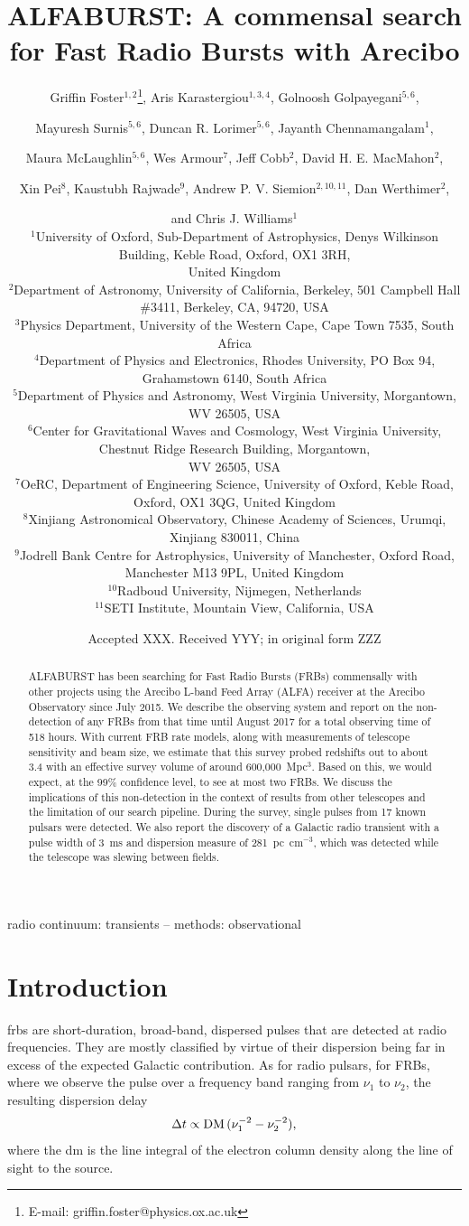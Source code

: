 \documentclass[a4paper,fleqn,usenatbib]{mnras}
\title[The ALFABURST Commensal FRB Survey]{ALFABURST: A commensal search for
Fast Radio Bursts with Arecibo}
\author[G. Foster et al.]{Griffin Foster$^{1,2}$\thanks{E-mail: griffin.foster@physics.ox.ac.uk},
Aris Karastergiou$^{1,3,4}$,
Golnoosh Golpayegani$^{5,6}$,
\and Mayuresh Surnis$^{5,6}$, 
Duncan R. Lorimer$^{5,6}$,
Jayanth Chennamangalam$^{1}$,
\and Maura McLaughlin$^{5,6}$,
Wes Armour$^{7}$,
Jeff Cobb$^{2}$,
David H. E. MacMahon$^{2}$,
\and Xin Pei$^{8}$,
Kaustubh Rajwade$^{9}$, 
Andrew P. V. Siemion$^{2,10,11}$,
Dan Werthimer$^{2}$,
\and and Chris J. Williams$^{1}$
\\
$^{1}$University of Oxford, Sub-Department of Astrophysics, Denys Wilkinson Building, Keble Road, Oxford, OX1 3RH,\\United Kingdom\\
$^{2}$Department of Astronomy, University of California, Berkeley, 501 Campbell Hall \#3411, Berkeley, CA, 94720, USA\\
$^{3}$Physics Department, University of the Western Cape, Cape Town 7535, South Africa\\
$^{4}$Department of Physics and Electronics, Rhodes University, PO Box 94, Grahamstown 6140, South Africa\\
$^{5}$Department of Physics and Astronomy, West Virginia University, Morgantown, WV 26505, USA\\
$^{6}$Center for Gravitational Waves and Cosmology, West Virginia University, Chestnut Ridge Research Building, Morgantown,\\ WV 26505, USA\\
$^{7}$OeRC, Department of Engineering Science, University of Oxford, Keble Road, Oxford, OX1 3QG, United Kingdom\\
$^{8}$Xinjiang Astronomical Observatory, Chinese Academy of Sciences, Urumqi, Xinjiang 830011, China\\
$^{9}$Jodrell Bank Centre for Astrophysics, University of Manchester, Oxford Road, Manchester M13 9PL, United Kingdom\\
$^{10}$Radboud University, Nijmegen, Netherlands\\
$^{11}$SETI Institute, Mountain View, California, USA\\
}
\date{Accepted XXX. Received YYY; in original form ZZZ}
\begin{document}
\label{firstpage}
\pagerange{\pageref{firstpage}--\pageref{lastpage}}
\maketitle

\begin{abstract}
ALFABURST has been searching for Fast Radio Bursts (FRBs) commensally with other
projects using the Arecibo L-band Feed Array (ALFA) receiver at the Arecibo
Observatory since July 2015. We describe the observing system and report on the
non-detection of any FRBs from that time until August 2017 for a total observing
time of 518 hours.  With current FRB rate models, along with measurements of
telescope sensitivity and beam size, we estimate that this survey probed
redshifts out to about 3.4 with an effective survey volume of around
600,000~Mpc$^3$. Based on this, we would expect, at the 99\% confidence level,
to see at most two FRBs.  We discuss the implications of this non-detection in
the context of results from other telescopes and the limitation of our search
pipeline.  During the survey, single pulses from 17 known pulsars were detected.
We also report the discovery of a Galactic radio transient with a pulse width of
3~ms and dispersion measure of 281~pc~cm$^{-3}$, which was detected while the
telescope was slewing between fields.
\end{abstract}

\begin{keywords}
radio continuum: transients -- methods: observational
\end{keywords}


\section{Introduction}
\label{sec:intro}

\glspl{frb} are short-duration, broad-band, dispersed pulses that are detected
at radio frequencies. They are mostly classified by virtue of their dispersion
being far in excess of the expected Galactic contribution. As for radio pulsars,
for FRBs, where we observe the pulse over a frequency band ranging from $\nu_1$
to $\nu_2$, the resulting dispersion delay 
%
\begin{equation}
\Delta t \propto {\rm DM} \, (\nu_1^{-2} - \nu_2^{-2}),
\end{equation}
%
where the \gls{dm} is the line integral of the electron column
density along the line of sight to the source.
\end{document}
